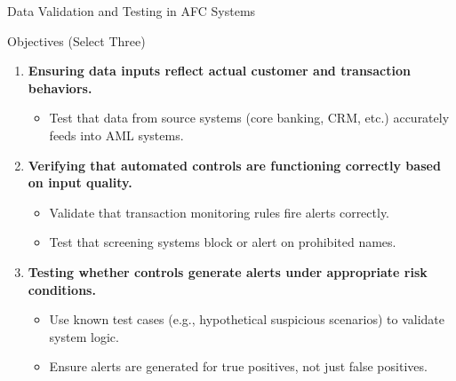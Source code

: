 \documentclass{beamer}
\begin{document}
	\begin{frame}{Data Validation and Testing in AFC Systems}
		\begin{block}{Objectives (Select Three)}
			\begin{enumerate}
				\item \textbf{Ensuring data inputs reflect actual customer and transaction behaviors.}
				\begin{itemize}
					\item Test that data from source systems (core banking, CRM, etc.) accurately feeds into AML systems.
				\end{itemize}
				\item \textbf{Verifying that automated controls are functioning correctly based on input quality.}
				\begin{itemize}
					\item Validate that transaction monitoring rules fire alerts correctly.
					\item Test that screening systems block or alert on prohibited names.
				\end{itemize}
				\item \textbf{Testing whether controls generate alerts under appropriate risk conditions.}
				\begin{itemize}
					\item Use known test cases (e.g., hypothetical suspicious scenarios) to validate system logic.
					\item Ensure alerts are generated for true positives, not just false positives.
				\end{itemize}
			\end{enumerate}
		\end{block}
	\end{frame}
	
\end{document}
